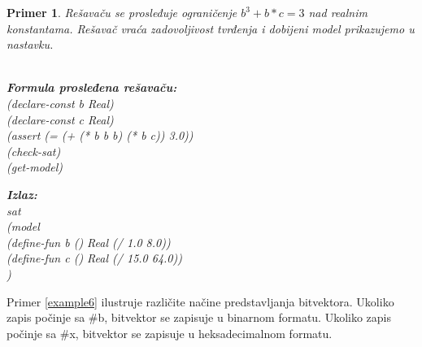 \documentclass[12pt,oneside]{memoir}
\newcommand\tab[1][0.5cm]{\hspace*{#1}}
\newtheorem{primer}{Primer}
\begin{document}
\begin{primer}
\label{example5} Rešavaču se prosleđuje ograničenje $b^{3} + b*c = 3$ nad realnim konstantama. Rešavač vraća zadovoljivost tvrđenja i dobijeni model prikazujemo u nastavku.   
\\ \\
\begin{minipage}[b]{0.43\textwidth}
\textbf{Formula prosleđena rešavaču:}
\\(declare-const b Real)
\\(declare-const c Real)
\\(assert (= (+ (* b b b) (* b c)) 3.0))
\\(check-sat)
\\(get-model)

\end{minipage}
\hspace{1.5cm}
\begin{minipage}[t]{0.45\textwidth}
\vspace{-3.4cm}
\textbf{Izlaz:}
\\sat 
\\(model 
\\\tab(define-fun b () Real (/ 1.0 8.0)) 
\\\tab(define-fun c () Real (/ 15.0 64.0))
\\)
\end{minipage}
\end{primer}
\par
Primer \ref{example6} ilustruje različite načine predstavljanja bitvektora. Ukoliko zapis počinje sa \#b, bitvektor se zapisuje u binarnom formatu. Ukoliko zapis počinje sa \#x, bitvektor se zapisuje u heksadecimalnom formatu.
\end{document}
